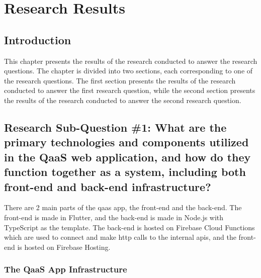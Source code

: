\chapter{Research Results}
\section{Introduction}
This chapter presents the results of the research conducted to answer the research questions. The chapter is
divided into two sections, each corresponding to one of the research questions. The first section presents
the results of the research conducted to answer the first research question, while the second section
presents the results of the research conducted to answer the second research question.

\section{Research Sub-Question \#1: What are the primary technologies and components utilized in the QaaS web application, and
  how do they function together as a system, including both front-end and back-end infrastructure?}

There are 2 main parts of the \acrshort{qaas} app, the front-end and the back-end. The front-end is made in
Flutter, and the back-end is made in Node.js with TypeScript as the template. The back-end is hosted on Firebase Cloud Functions which are
used to connect and make \acrshort{http} calls to the internal \acrshort{api}s, and the front-end is hosted on Firebase Hosting.

\subsection{The QaaS App Infrastructure}

